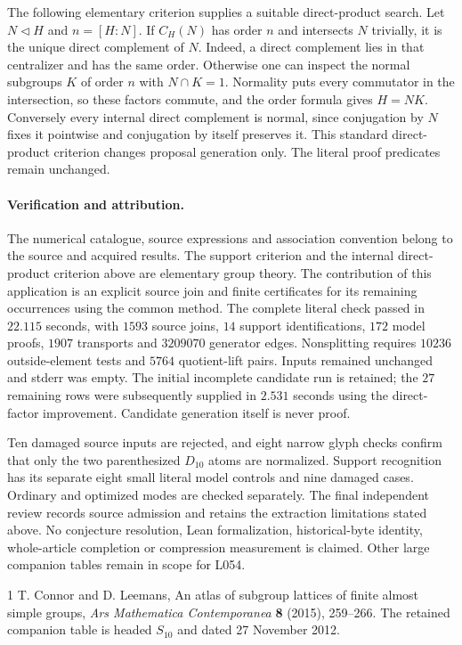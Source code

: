 \documentclass[11pt]{article}
\begin{document}
The following elementary criterion supplies a suitable direct-product
search. Let $N\triangleleft H$ and $n=[H:N]$. If $C_H(N)$ has order $n$
and intersects $N$ trivially, it is the unique direct complement of $N$.
Indeed, a direct complement lies in that centralizer and has the same
order. Otherwise one can inspect the normal subgroups $K$ of order $n$
with $N\cap K=1$. Normality puts every commutator in the intersection,
so these factors commute, and the order formula gives $H=NK$.
Conversely every internal direct complement is normal, since conjugation
by $N$ fixes it pointwise and conjugation by itself preserves it.
This standard direct-product criterion changes proposal generation only.
The literal proof predicates remain unchanged.

\paragraph{Verification and attribution.}
The numerical catalogue, source expressions and association convention
belong to the source and acquired results. The support criterion and the
internal direct-product criterion above are elementary group theory.
The contribution of this application is an explicit source join and
finite certificates for its remaining occurrences using the common
method. The complete literal check passed in $22.115$ seconds, with
$1593$ source joins, $14$ support identifications, $172$ model proofs,
$1907$ transports and $3209070$ generator edges. Nonsplitting requires
$10236$ outside-element tests and $5764$ quotient-lift pairs. Inputs
remained unchanged and stderr was empty. The initial incomplete candidate
run is retained; the $27$ remaining rows were subsequently supplied in
$2.531$ seconds using the direct-factor improvement. Candidate generation
itself is never proof.

Ten damaged source inputs are rejected, and eight narrow glyph checks
confirm that only the two parenthesized $D_{10}$ atoms are normalized.
Support recognition has its separate eight small literal model controls
and nine damaged cases. Ordinary and optimized modes are checked
separately. The final independent review records source admission and
retains the extraction limitations stated above. No conjecture resolution,
Lean formalization, historical-byte identity, whole-article completion or
compression measurement is claimed. Other large companion tables remain
in scope for L054.

\begin{thebibliography}{1}
 T. Connor and D. Leemans,
An atlas of subgroup lattices of finite almost simple groups,
\emph{Ars Mathematica Contemporanea} \textbf{8} (2015), 259--266.
The retained companion table is headed $S_{10}$ and dated
27 November 2012.
\end{thebibliography}
\end{document}
